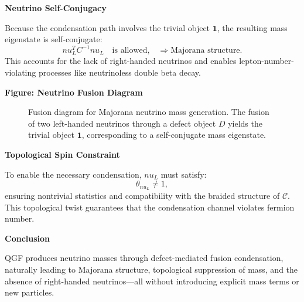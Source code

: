 \documentclass[11pt]{article}
\def\nu{nu}
\begin{document}
\vspace{0.5em}
\noindent\textbf{Neutrino Self-Conjugacy}

Because the condensation path involves the trivial object \( \mathbf{1} \), the resulting mass eigenstate is self-conjugate:
\[
\nu_L^T C^{-1} \nu_L \quad \text{is allowed,} \quad \Rightarrow \text{Majorana structure}.
\]
This accounts for the lack of right-handed neutrinos and enables lepton-number-violating processes like neutrinoless double beta decay.

\vspace{0.5em}
\noindent\textbf{Figure: Neutrino Fusion Diagram}

\begin{figure}[H]
\centering
{}
\caption{Fusion diagram for Majorana neutrino mass generation. The fusion of two left-handed neutrinos through a defect object \( D \) yields the trivial object \( \mathbf{1} \), corresponding to a self-conjugate mass eigenstate.}
\label{fig:neutrino-condensation}
\end{figure}

\vspace{0.5em}
\noindent\textbf{Topological Spin Constraint}

To enable the necessary condensation, \( \nu_L \) must satisfy:
\[
\theta_{\nu_L} \neq 1,
\]
ensuring nontrivial statistics and compatibility with the braided structure of \( \mathcal{C} \). This topological twist guarantees that the condensation channel violates fermion number.

\vspace{0.5em}
\noindent\textbf{Conclusion}

QGF produces neutrino masses through defect-mediated fusion condensation, naturally leading to Majorana structure, topological suppression of mass, and the absence of right-handed neutrinos—all without introducing explicit mass terms or new particles.
\end{document}
